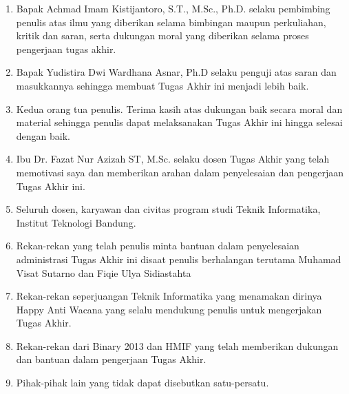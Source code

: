 \begin{enumerate}
    \item Bapak Achmad Imam Kistijantoro, S.T., M.Sc., Ph.D. selaku pembimbing penulis atas ilmu yang diberikan selama bimbingan maupun perkuliahan, kritik dan saran, serta dukungan moral yang diberikan selama proses pengerjaan tugas akhir.

    \item Bapak Yudistira Dwi Wardhana Asnar, Ph.D selaku penguji atas saran dan masukkannya sehingga membuat Tugas Akhir ini menjadi lebih baik.

    \item Kedua orang tua penulis. Terima kasih atas dukungan baik secara moral dan material sehingga penulis dapat melaksanakan Tugas Akhir ini hingga selesai dengan baik.
    
    \item Ibu Dr. Fazat Nur Azizah ST, M.Sc. selaku dosen Tugas Akhir yang telah memotivasi saya dan memberikan arahan dalam penyelesaian dan pengerjaan Tugas Akhir ini.
    
    
    
    \item Seluruh dosen, karyawan dan civitas program studi Teknik Informatika, Institut Teknologi Bandung.
    
    \item Rekan-rekan yang telah penulis minta bantuan dalam penyelesaian administrasi Tugas Akhir ini disaat penulis berhalangan terutama Muhamad Visat Sutarno dan Fiqie Ulya Sidiastahta
    
    
    \item Rekan-rekan seperjuangan Teknik Informatika yang menamakan dirinya Happy Anti Wacana yang selalu mendukung penulis untuk mengerjakan Tugas Akhir.
    
    \item Rekan-rekan dari Binary 2013 dan HMIF yang telah memberikan dukungan dan bantuan dalam pengerjaan Tugas Akhir.
    
    \item Pihak-pihak lain yang tidak dapat disebutkan satu-persatu.
\end{enumerate}

